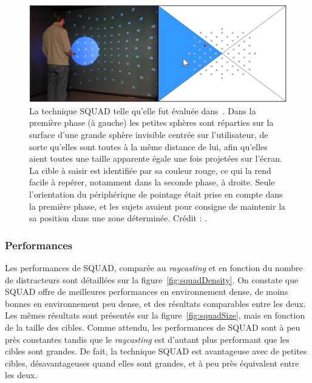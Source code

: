 	\begin{figure}[H]
		\centering
		\includegraphics[width=\textwidth]{figures/ch2/squad2}
		\caption[La technique SQUAD -- évaluation]{La technique SQUAD telle qu'elle fut évaluée dans~\cite{kopper2011rapid}. Dans la première phase (à gauche) les petites sphères sont réparties sur la surface d'une grande sphère invisible centrée sur l'utilisateur, de sorte qu'elles sont toutes à la même distance de lui, afin qu'elles aient toutes une taille apparente égale une fois projetées sur l'écran. La cible à saisir est identifiée par sa couleur rouge, ce qui la rend facile à repérer, notamment dans la seconde phase, à droite. Seule l'orientation du périphérique de pointage était prise en compte dans la première phase, et les sujets avaient pour consigne de maintenir la sa position dans une zone déterminée. Crédit : \cite{kopper2011rapid}.}
		\label{fig:squad2}
	\end{figure}
	
	\subsubsection{Performances}
	Les performances de SQUAD, comparée au \emph{raycasting} et en fonction du nombre de distracteurs sont détaillées sur la figure~\ref{fig:squadDensity}. On constate que SQUAD offre de meilleures performances en environnement dense, de moins bonnes en environnement peu dense, et des résultats comparables entre les deux. Les mêmes résultats sont présentés sur la figure~\ref{fig:squadSize}, mais en fonction de la taille des cibles. Comme attendu, les performances de SQUAD sont à peu près constantes tandis que le \emph{raycasting} est d'autant plus performant que les cibles sont grandes. De fait, la technique SQUAD est avantageuse avec de petites cibles, désavantageuses quand elles sont grandes, et à peu près équivalent entre les deux.
	

